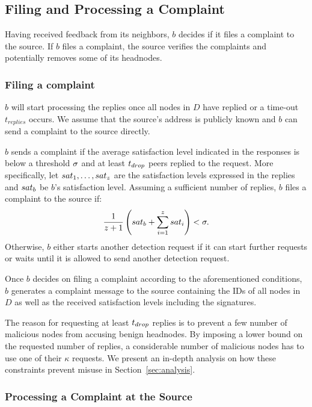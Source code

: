 \subsection{Filing and Processing a Complaint}

Having received feedback from its neighbors, $b$ decides if it files a complaint to the source. If $b$ files a complaint, the source verifies the complaints and potentially removes some of its headnodes. 

\subsubsection*{Filing a complaint}
$b$ will start processing the replies once all nodes in $D$ have replied or a time-out $t_{replies}$ occurs. 
We assume that the source's address is publicly known and $b$ can send a complaint to the source directly.

$b$ sends a complaint if the average satisfaction level indicated in the responses is below a threshold $\sigma$ and at least $t_{drop}$ peers replied to the request. 
More specifically, let $sat_1, \ldots ,sat_z$ are the satisfaction levels expressed in the replies and $sat_b$ be $b$'s satisfaction level. 
Assuming a sufficient number of replies, $b$ files a complaint to the source if:
\begin{align}
\label{eq:drop_satis_equation}
\frac{1}{z+1}\left( \sat_b + \sum_{i=1}^{z} \sat_i \right) < \satThres. 
\end{align} 
Otherwise, $b$ either starts another detection request if it can start further requests or waits until it is allowed to send another detection request.

 

Once $b$ decides on filing a complaint according to the aforementioned conditions, $b$ generates a complaint message to the source containing the IDs of all nodes in $D$ as well as the received satisfaction levels including the signatures.  


The reason for requesting at least $t_{drop}$ replies is to prevent a few number of malicious nodes from accusing benign headnodes. By imposing a lower bound on the requested number of replies, a considerable number of malicious nodes has to use one of their $\kappa$ requests. We present an in-depth analysis on how these constraints prevent misuse in Section~\ref{sec:analysis}. 





\subsubsection*{Processing a Complaint at the Source}

